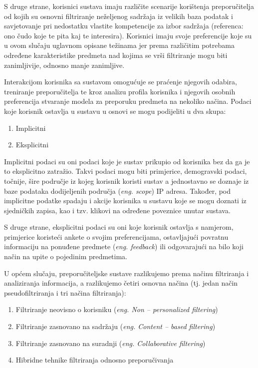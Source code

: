 \documentclass[times, utf8, diplomski, numeric]{fer}
\begin{document}
S druge strane, korisnici sustava imaju različite scenarije korištenja
preporučitelja od kojih su osnovni filtriranje neželjenog sadržaja iz velikih
baza podatak i savjetovanje pri nedostatku vlastite kompetencije za izbor
sadržaja (referenca: ono čudo koje te pita kaj te interesira). Korisnici imaju
svoje preferencije koje su u ovom slučaju uglavnom opisane težinama jer prema
različitim potrebama određene karakteristike predmeta nad kojima se vrši
filtriranje mogu biti zanimljivije, odnosno manje zanimljive.

Interakcijom korisnika sa sustavom omogućuje se praćenje njegovih odabira,
treniranje preporučitelja te kroz analizu profila korisnika i njegovih osobnih
preferencija stvaranje modela za preporuku predmeta na nekoliko načina. Podaci
koje korisnik ostavlja u sustavu u osnovi se mogu podijeliti u dva skupa:
\begin{enumerate}
  \item Implicitni
  \item Eksplicitni
\end{enumerate}
Implicitni podaci su oni podaci koje je sustav prikupio od korisnika bez da ga
je to eksplicitno zatražio. Takvi podaci mogu biti primjerice, demogravski
podaci, točnije, šire područje iz kojeg korisnik koristi sustav a jednostavno se
doznaje iz baze podataka dodijeljenih područja (\emph{eng. scope}) IP adresa.
Također, pod implicitne podatke spadaju i akcije korisnika u sustavu koje se
mogu doznati iz sjedničkih zapisa, kao i tzv. klikovi na određene poveznice
unutar sustava.

S druge strane, eksplicitni podaci su oni koje korisnik ostavlja s namjerom,
primjerice koristeći ankete o svojim preferencijama, ostavljajući povratnu
informaciju na ponuđene predmete (\emph{eng. feedback}) ili odgovarajući na bilo
koji način na upite o pojedinim predmetima.

U općem slučaju, preporučiteljske sustave razlikujemo prema načinu filtriranja i
analiziranja informacija, a razlikujemo četiri osnovna načina (tj. jedan način
pseudofiltriranja i tri načina filtriranja):
\begin{enumerate}
  \item Filtriranje neovisno o korisniku (\emph{eng. Non -- personalized
  filtering})
  \item Filtriranje zasnovano na sadržaju (\emph{eng. Content -- based
  filtering})
  \item Filtriranje zasnovano na suradnji (\emph{eng. Collaborative
  filtering})
  \item Hibridne tehnike filtriranja odnosno preporučivanja
\end{enumerate}
\end{document}
